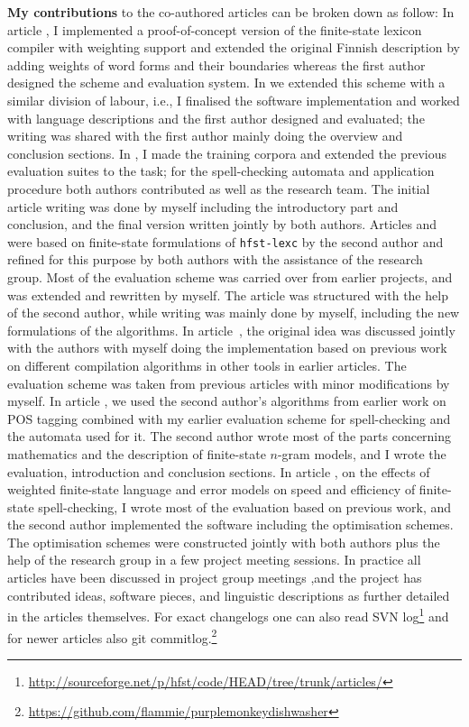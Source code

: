 \documentclass[officiallayout,final]{unihelcompling}
\begin{document}
\textbf{My contributions} to the co-authored articles can be broken down as
follow: In article , I implemented a
proof-of-concept version of the finite-state lexicon compiler with weighting
support and extended the original Finnish description by adding weights of word
forms and their boundaries whereas the first author designed the scheme and
evaluation system. In  we extended this scheme
with a similar division of labour, i.e., I finalised the software
implementation and worked with language descriptions and the first author
designed and evaluated; the writing was shared with the first author mainly
doing the overview and conclusion sections. In
, I made the training corpora and extended
the previous evaluation suites to the task; for the spell-checking automata and
application procedure both authors contributed as well as the research team.
The initial article writing was done by myself including the introductory part
and conclusion, and the final version written jointly by both authors. Articles
 and  were
based on finite-state formulations of \texttt{hfst-lexc} by the second author
and refined for this purpose by both authors with the assistance of the
research group. Most of the evaluation scheme was carried over from earlier
projects, and was extended and rewritten by myself. The article was structured
with the help of the second author, while writing was mainly done by myself,
including the new formulations of the algorithms. In
article~, the original idea was discussed
jointly with the authors with myself doing the implementation based on previous
work on different compilation algorithms in other tools in earlier articles.
The evaluation scheme was taken from previous articles with minor modifications
by myself. In article , we used the second
author's algorithms from earlier work on POS tagging combined with my earlier
evaluation scheme for spell-checking and the automata used for it.  The second
author wrote most of the parts concerning mathematics and the description of
finite-state \(n\)-gram models, and I wrote the evaluation, introduction and
conclusion sections. In article , on the effects
of weighted finite-state language and error models on speed and efficiency of
finite-state spell-checking, I wrote most of the evaluation based on previous
work, and the second author implemented the software including the optimisation
schemes. The optimisation schemes were constructed jointly with both authors
plus the help of the research group in a few project meeting sessions.  In
practice all articles have been discussed in project group meetings ,and the
project has contributed ideas, software pieces, and linguistic descriptions as
further detailed in the articles themselves. For exact changelogs one can also
read SVN
log\footnote{\url{http://sourceforge.net/p/hfst/code/HEAD/tree/trunk/articles/}}
and for newer articles also git
commitlog.\footnote{\url{https://github.com/flammie/purplemonkeydishwasher}}
\end{document}
